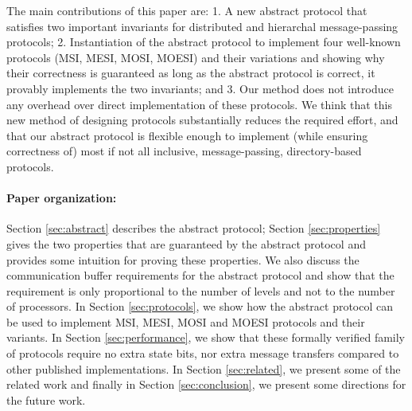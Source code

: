The main contributions of this paper are: 1. A new abstract protocol that satisfies two important invariants for distributed and hierarchal message-passing protocols; 2. Instantiation of the abstract protocol to implement four well-known protocols (MSI, MESI, MOSI, MOESI) and their variations and showing why their correctness is guaranteed as long as the abstract protocol is correct, \ie it provably implements the two invariants; and 3. Our method does not introduce any overhead over direct implementation of these protocols.  We think that this new method of designing protocols substantially reduces the required effort, and that our abstract protocol is flexible enough to implement (while ensuring correctness of) most if not all inclusive, message-passing, directory-based protocols.

\paragraph{Paper organization:} Section \ref{sec:abstract} describes the abstract protocol; Section \ref{sec:properties} gives the two properties that are guaranteed by the abstract protocol and provides some intuition for proving these properties. We also discuss the communication buffer requirements for the abstract protocol and show that the requirement is only proportional to the number of levels and not to the number of processors. In Section \ref{sec:protocols}, we show how the abstract protocol can be used to implement MSI, MESI, MOSI and MOESI protocols and their variants. In Section \ref{sec:performance}, we show that these formally verified family of protocols require no extra state bits, nor extra message transfers compared to other published implementations. In Section \ref{sec:related}, we present some of the related work and finally in Section \ref{sec:conclusion}, we present some directions for the future work.
